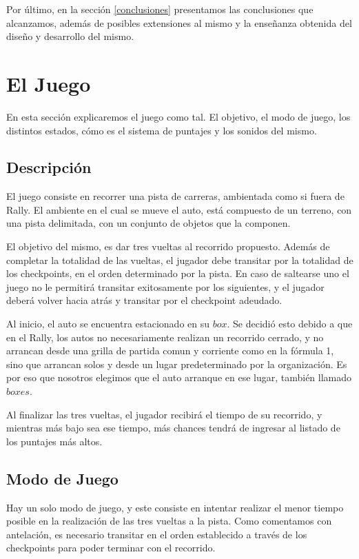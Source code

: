 \documentclass[a4paper,10pt]{article}
\begin{document}
Por \'ultimo, en la secci\'on \ref{conclusiones} presentamos las
conclusiones que alcanzamos, adem\'as de posibles
extensiones al mismo y la
ense\~nanza obtenida del dise\~no y desarrollo del mismo.

\section{El Juego}
\label{el_juego}

En esta secci\'on explicaremos el juego como tal.  El objetivo, el
modo
de
juego, los distintos estados, c\'omo es el sistema de puntajes y los sonidos
del mismo.

\subsection{Descripci\'on}
El juego consiste en recorrer una pista de carreras, ambientada como si fuera
de Rally.  El ambiente en el cual se mueve el auto, est\'a compuesto de un
terreno, con una pista delimitada, con un conjunto de objetos que la componen.

El objetivo del mismo, es dar tres vueltas al recorrido propuesto.  Adem\'as de
completar la totalidad de las vueltas, el jugador debe transitar por la
totalidad de los checkpoints, en el orden determinado por la pista.  En caso de
saltearse uno el juego no le permitir\'a transitar exitosamente por los
siguientes, y el jugador deber\'a volver hacia atr\'as y transitar por el
checkpoint adeudado.

Al inicio, el auto se encuentra estacionado en su $box$.  Se decidi\'o esto
debido a que en el Rally, los autos no necesariamente realizan un recorrido
cerrado, y no arrancan desde una grilla de partida comun y corriente como en la
f\'ormula 1,  sino que arrancan solos y desde un lugar predeterminado por la
organizaci\'on. Es por eso que nosotros elegimos que el auto arranque en ese
lugar, tambi\'en llamado $boxes$.

Al finalizar las tres vueltas, el jugador recibir\'a el tiempo de su recorrido,
y
mientras m\'as bajo sea ese tiempo, m\'as chances tendr\'a de ingresar al
listado
de
los puntajes m\'as altos.
\subsection{Modo de Juego}
Hay un solo modo de juego, y este consiste en intentar realizar el menor tiempo
posible en la realizaci\'on de las tres vueltas a la pista.  Como comentamos
con antelaci\'on, es necesario transitar en el orden establecido a trav\'es de
los checkpoints para poder terminar con el recorrido.
\end{document}
